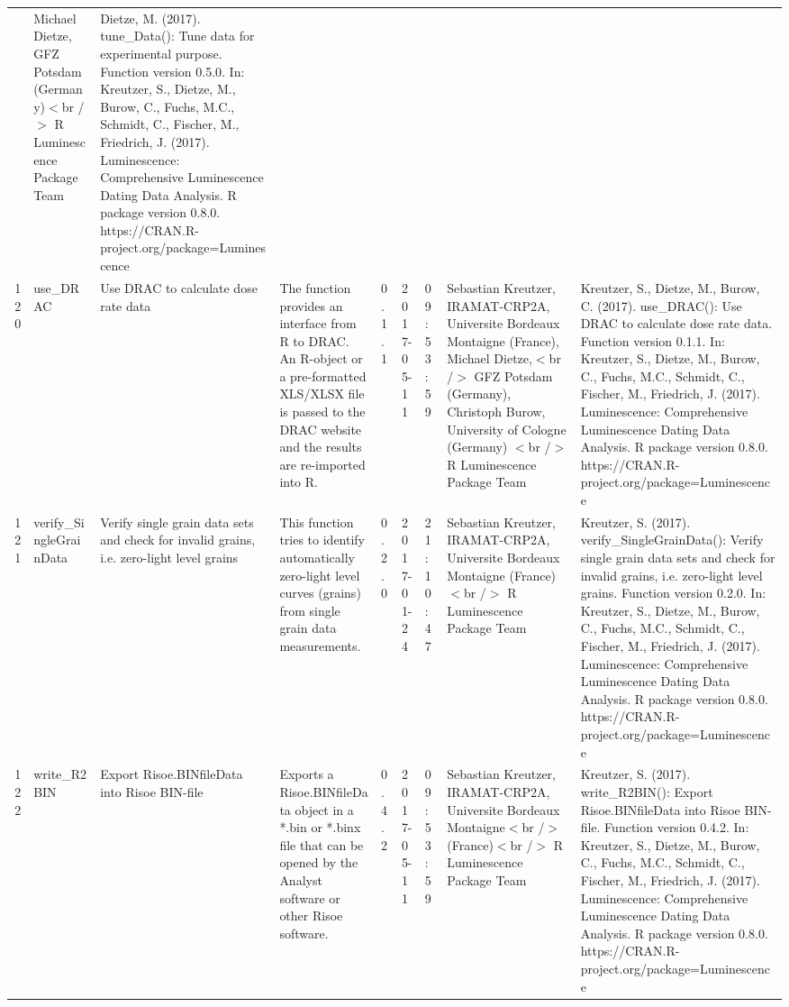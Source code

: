 \begin{table}[ht]
\begin{tabular}{rllllllll}
 & Michael Dietze, GFZ Potsdam (Germany)$<$br /$>$  R Luminescence Package Team & Dietze, M. (2017). tune\_Data(): Tune data for experimental purpose. Function version 0.5.0. In: Kreutzer, S., Dietze, M., Burow, C., Fuchs, M.C., Schmidt, C., Fischer, M., Friedrich, J. (2017). Luminescence: Comprehensive Luminescence Dating Data Analysis. R package version 0.8.0. https://CRAN.R-project.org/package=Luminescence
 \\ 
  120 & use\_DRAC & Use DRAC to calculate dose rate data & The function provides an interface from R to DRAC. An R-object or a pre-formatted XLS/XLSX file is passed to the DRAC website and the results are re-imported into R. & 0.1.1 & 2017-05-11 & 09:53:59
 & Sebastian Kreutzer, IRAMAT-CRP2A, Universite Bordeaux Montaigne (France), Michael Dietze,$<$br /$>$ GFZ Potsdam (Germany), Christoph Burow, University of Cologne (Germany) $<$br /$>$  R Luminescence Package Team & Kreutzer, S., Dietze, M., Burow, C. (2017). use\_DRAC(): Use DRAC to calculate dose rate data. Function version 0.1.1. In: Kreutzer, S., Dietze, M., Burow, C., Fuchs, M.C., Schmidt, C., Fischer, M., Friedrich, J. (2017). Luminescence: Comprehensive Luminescence Dating Data Analysis. R package version 0.8.0. https://CRAN.R-project.org/package=Luminescence
 \\ 
  121 & verify\_SingleGrainData & Verify single grain data sets and check for invalid grains, i.e. zero-light level grains & This function tries to identify automatically zero-light level curves (grains) from single grain data measurements. & 0.2.0 & 2017-01-24 & 21:10:47
 & Sebastian Kreutzer, IRAMAT-CRP2A, Universite Bordeaux Montaigne (France)$<$br /$>$  R Luminescence Package Team & Kreutzer, S. (2017). verify\_SingleGrainData(): Verify single grain data sets and check for invalid grains, i.e. zero-light level grains. Function version 0.2.0. In: Kreutzer, S., Dietze, M., Burow, C., Fuchs, M.C., Schmidt, C., Fischer, M., Friedrich, J. (2017). Luminescence: Comprehensive Luminescence Dating Data Analysis. R package version 0.8.0. https://CRAN.R-project.org/package=Luminescence
 \\ 
  122 & write\_R2BIN & Export Risoe.BINfileData into Risoe BIN-file & Exports a Risoe.BINfileData object in a *.bin or *.binx file that can be opened by the Analyst software or other Risoe software. & 0.4.2 & 2017-05-11 & 09:53:59
 & Sebastian Kreutzer, IRAMAT-CRP2A, Universite Bordeaux Montaigne$<$br /$>$ (France)$<$br /$>$  R Luminescence Package Team & Kreutzer, S. (2017). write\_R2BIN(): Export Risoe.BINfileData into Risoe BIN-file. Function version 0.4.2. In: Kreutzer, S., Dietze, M., Burow, C., Fuchs, M.C., Schmidt, C., Fischer, M., Friedrich, J. (2017). Luminescence: Comprehensive Luminescence Dating Data Analysis. R package version 0.8.0. https://CRAN.R-project.org/package=Luminescence

\end{tabular}
\end{table}
